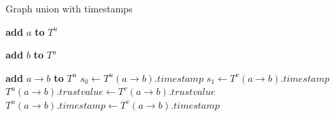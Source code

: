 \begin{algorithm}
\caption{Graph union with timestamps}\label{algorithm:union_timestamp}
\begin{algorithmic}[1]



		\State \textbf{add} $a$ \textbf{to} $T^u$
	\EndIf
	
		\State \textbf{add} $b$ \textbf{to} $T^u$
	\EndIf
	
		\State \textbf{add} $a\rightarrow b$ \textbf{to} $T^u$
	\Else
		\State $s_0 \gets T^u(a\rightarrow b).timestamp$
		\State $s_1 \gets T^v(a\rightarrow b).timestamp$
			\State $T^u(a\rightarrow b).trustvalue \gets T^v(a\rightarrow b).trustvalue$
			\State $T^u(a\rightarrow b).timestamp \gets T^v(a\rightarrow b).timestamp$
		\EndIf	
	\EndIf
\EndFor

\EndFunction
\end{algorithmic}
\end{algorithm}

